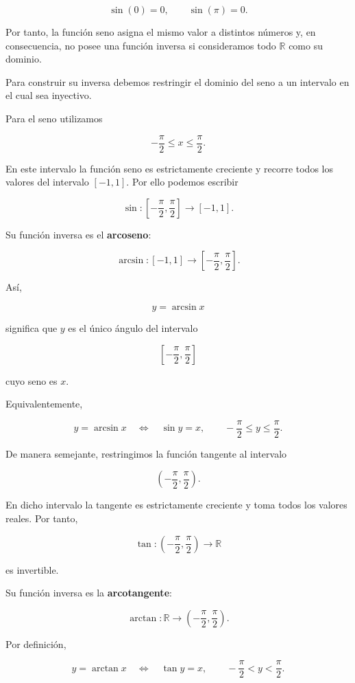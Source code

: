 \documentclass[12pt]{article}
\theoremstyle{definition}
\theoremstyle{remark}
\begin{document}
\[
\sin(0)=0,
\qquad
\sin(\pi)=0.
\]

Por tanto, la función seno asigna el mismo valor a distintos números y,
en consecuencia, no posee una función inversa si consideramos todo
$\mathbb{R}$ como su dominio.

Para construir su inversa debemos restringir el dominio del seno a un
intervalo en el cual sea inyectivo.

Para el seno utilizamos

\[
-\frac{\pi}{2}\leq x\leq\frac{\pi}{2}.
\]

En este intervalo la función seno es estrictamente creciente y recorre
todos los valores del intervalo $[-1,1]$. Por ello podemos escribir

\[
\sin:
\left[-\frac{\pi}{2},\frac{\pi}{2}\right]
\longrightarrow [-1,1].
\]

Su función inversa es el \textbf{arcoseno}:

\[
\arcsin:
[-1,1]
\longrightarrow
\left[-\frac{\pi}{2},\frac{\pi}{2}\right].
\]

Así,

\[
y=\arcsin x
\]

significa que $y$ es el único ángulo del intervalo

\[
\left[-\frac{\pi}{2},\frac{\pi}{2}\right]
\]

cuyo seno es $x$.

Equivalentemente,

\[
\boxed{
y=\arcsin x
\quad\Longleftrightarrow\quad
\sin y=x,
\qquad
-\frac{\pi}{2}\leq y\leq\frac{\pi}{2}.
}
\]

De manera semejante, restringimos la función tangente al intervalo

\[
\left(-\frac{\pi}{2},\frac{\pi}{2}\right).
\]

En dicho intervalo la tangente es estrictamente creciente y toma todos
los valores reales. Por tanto,

\[
\tan:
\left(-\frac{\pi}{2},\frac{\pi}{2}\right)
\longrightarrow\mathbb{R}
\]

es invertible.

Su función inversa es la \textbf{arcotangente}:

\[
\arctan:
\mathbb{R}
\longrightarrow
\left(-\frac{\pi}{2},\frac{\pi}{2}\right).
\]

Por definición,

\[
\boxed{
y=\arctan x
\quad\Longleftrightarrow\quad
\tan y=x,
\qquad
-\frac{\pi}{2}<y<\frac{\pi}{2}.
}
\]

\end{document}
